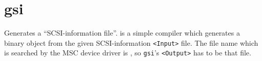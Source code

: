 \section{gsi}
\begin{man}
  \PP Generates a ``SCSI-information file''.
   is a simple compiler which generates a binary object from the
             given SCSI-information {\tt <Input>} file. The file name which is
             searched by the MSC device driver is \HESI,
             so {\tt gsi}'s {\tt <Output>} has to be that file.
\end{man}
